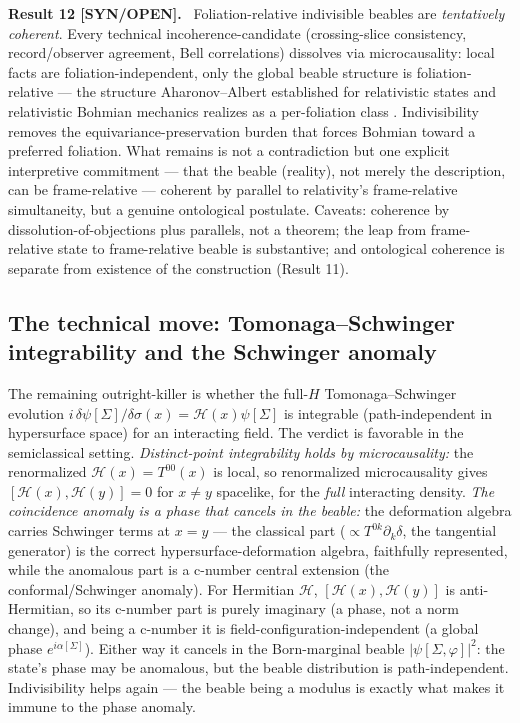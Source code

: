 \documentclass[aps,prd,preprint,amsmath,amssymb,nofootinbib,superscriptaddress]{revtex4-2}
\newenvironment{result}[1]{\par\medskip\noindent\textbf{#1}\ }{\par\medskip}
\begin{document}
\begin{result}{Result 12 [SYN/OPEN].}
Foliation-relative indivisible beables are \emph{tentatively coherent}. Every technical
incoherence-candidate (crossing-slice consistency, record/observer agreement, Bell
correlations) dissolves via microcausality: local facts are foliation-independent, only the
global beable structure is foliation-relative --- the structure Aharonov--Albert established
for relativistic states \cite{AharonovAlbert1980} and relativistic Bohmian mechanics realizes
as a per-foliation class \cite{DurrEtAl2014}. Indivisibility removes the equivariance-preservation
burden that forces Bohmian toward a preferred foliation. What remains is not a contradiction
but one explicit interpretive commitment --- that the beable (reality), not merely the
description, can be frame-relative --- coherent by parallel to relativity's frame-relative
simultaneity, but a genuine ontological postulate. Caveats: coherence by dissolution-of-objections
plus parallels, not a theorem; the leap from frame-relative state to frame-relative beable is
substantive; and ontological coherence is separate from existence of the construction (Result 11).
\end{result}

\subsection{The technical move: Tomonaga--Schwinger integrability and the Schwinger anomaly}
The remaining outright-killer is whether the full-$H$ Tomonaga--Schwinger evolution
$i\,\delta\psi[\Sigma]/\delta\sigma(x)=\mathcal H(x)\psi[\Sigma]$ is integrable
(path-independent in hypersurface space) for an interacting field. The verdict is favorable in
the semiclassical setting. \emph{Distinct-point integrability holds by microcausality:} the
renormalized $\mathcal H(x)=T^{00}(x)$ is local, so renormalized microcausality gives
$[\mathcal H(x),\mathcal H(y)]=0$ for $x\neq y$ spacelike, for the \emph{full} interacting
density. \emph{The coincidence anomaly is a phase that cancels in the beable:} the deformation
algebra carries Schwinger terms at $x=y$ --- the classical part ($\propto T^{0k}\partial_k\delta$,
the tangential generator) is the correct hypersurface-deformation algebra, faithfully
represented, while the anomalous part is a c-number central extension (the conformal/Schwinger
anomaly). For Hermitian $\mathcal H$, $[\mathcal H(x),\mathcal H(y)]$ is anti-Hermitian, so its
c-number part is purely imaginary (a phase, not a norm change), and being a c-number it is
field-configuration-independent (a global phase $e^{i\alpha[\Sigma]}$). Either way it cancels in
the Born-marginal beable $|\psi[\Sigma,\varphi]|^2$: the state's phase may be anomalous, but the
beable distribution is path-independent. Indivisibility helps again --- the beable being a
modulus is exactly what makes it immune to the phase anomaly.
\end{document}
